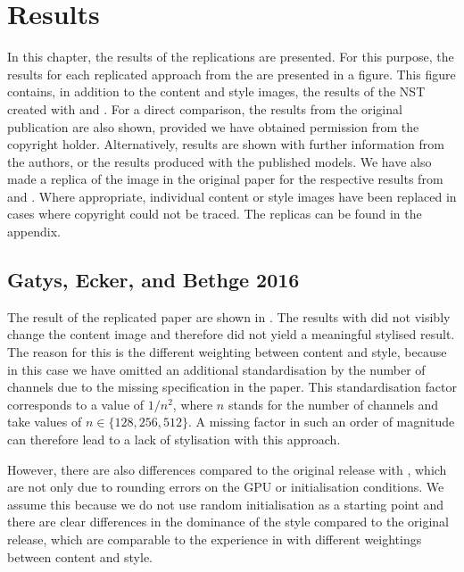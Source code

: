 \section{Results}
In this chapter, the results of the replications are presented. For this purpose, the results for each replicated approach from the  are presented in a figure. This figure contains, in addition to the content and style images, the results of the \gls{NST} created with \paper{} and \implementation{}. For a direct comparison, the results from the original publication are also shown, provided we have obtained permission from the copyright holder. Alternatively, results are shown with further information from the authors, or the results produced with the published models. We have also made a replica of the image in the original paper for the respective results from \paper{} and \implementation{}. Where appropriate, individual content or style images have been replaced in cases where copyright could not be traced. The replicas can be found in the appendix. 

\subsection{Gatys, Ecker, and Bethge 2016} \label{sec:Gatys1results}
The result of the replicated paper \cite{GEB2016} are shown in . The results with \paper{} did not visibly change the content image and therefore did not yield a meaningful stylised result. The reason for this is the different weighting between content and style, because in this case we have omitted an additional standardisation by the number of channels due to the missing specification in the paper. This standardisation factor corresponds to a value of $1/n^2$, where $n$ stands for the number of channels and take values of $n \in \{128, 256, 512\}$. A missing factor in such an order of magnitude can therefore lead to a lack of stylisation with this approach.

However, there are also differences compared to the original release with \implementation{}, which are not only due to rounding errors on the \gls{GPU} or initialisation conditions. We assume this because we do not use random initialisation as a starting point and there are clear differences in the dominance of the style compared to the original release, which are comparable to the experience in  with different weightings between content and style.

